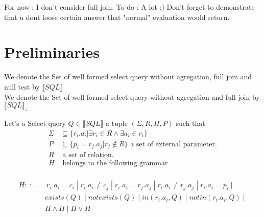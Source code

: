 
For now : 
I don't consider full-join.
To do : A lot :) 
Don't forget to demonstrate that u dont loose certain answer that "normal" evaluation would return.

\section{Preliminaries}

\begin{mydef}
	We denote the Set of well formed select query without agregation, full join and null test by $\llbracket SQL\rrbracket$
	\\We denote the Set of well formed select query without agregation and full join by $\llbracket SQL\rrbracket _\bot$
\end{mydef}

\begin{mydef}
Let's a Select query $Q \in \llbracket SQL\rrbracket$ a tuple $(\Sigma,R,H,P)$ such that
\begin{align*}
\Sigma & \subseteq \{r_i.a_i | \exists r_i \in R \land \exists a_i \in r_i \} \\
P & \subseteq \{p_i = r_j.a_j | r_j \notin R\} \mbox{ a set of external parameter.}\\
R & \mbox{ a set of relation.}\\
H &  \mbox{ belongs to the following grammar}\\
\end{align*}

\begin{align*}
H ::= &\ r_i.a_i = c_i \; |\; r_i.a_i \neq c_j \; |\; r_i.a_i = r_j.a_j \; |\;  r_i.a_i \neq r_j.a_j \;  |\; r_i.a_i = p_i\; |\; 
\\ &  exists(Q) \; |\; notexists(Q) \; |\; in(r_i.a_i,Q) \; |\; notin(r_i.a_i,Q) \; |\; 
\\ & H\land H \; |\; H \lor H 
\\
\end{align*}

\end{mydef}

